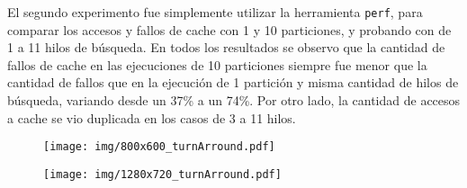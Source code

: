 El segundo experimento fue simplemente utilizar la herramienta \texttt{perf},
para comparar los accesos y fallos de cache con 1 y 10 particiones, y probando
con de 1 a 11 hilos de búsqueda. En todos los resultados se observo que la
cantidad de fallos de cache en las ejecuciones de 10 particiones siempre fue
menor que la cantidad de fallos que en la ejecución de 1 partición y misma
cantidad de hilos de búsqueda, variando desde un 37\% a un 74\%. Por otro lado,
la cantidad de accesos a cache se vio duplicada en los casos de 3 a 11 hilos.

\begin{figure}[h]

	\texttt{[image: img/800x600\_turnArround.pdf]}
	\caption{}

\end{figure}

\begin{figure}[h]

	\texttt{[image: img/1280x720\_turnArround.pdf]}
	\caption{}

\end{figure}
